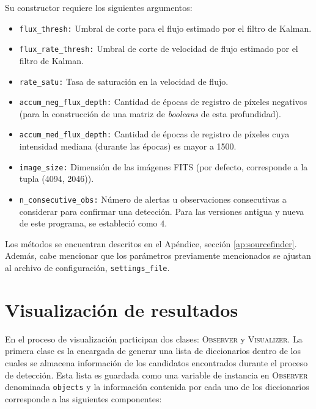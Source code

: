 Su constructor requiere los siguientes argumentos:
\begin{itemize}
\item \texttt{flux\_thresh:} Umbral de corte para el flujo estimado por el filtro de Kalman.
\item \texttt{flux\_rate\_thresh:} Umbral de corte de velocidad de flujo estimado por el filtro de Kalman.
\item \texttt{rate\_satu:} Tasa de saturaci\'on en la velocidad de flujo.
\item \texttt{accum\_neg\_flux\_depth:} Cantidad de \'epocas de registro de p\'ixeles negativos (para la construcci\'on de una matriz de \textit{booleans} de esta profundidad).
\item \texttt{accum\_med\_flux\_depth:} Cantidad de \'epocas de registro de p\'ixeles cuya intensidad mediana (durante las \'epocas) es mayor a 1500.
\item \texttt{image\_size:} Dimensi\'on de las im\'agenes FITS (por defecto, corresponde a la tupla (4094, 2046)).
\item \texttt{n\_consecutive\_obs:} N\'umero de alertas u observaciones consecutivas a considerar para confirmar una detecci\'on. Para las versiones antigua y nueva de este programa, se estableci\'o como $4$.

\end{itemize}

Los m\'etodos se encuentran descritos en el Ap\'endice, secci\'on \ref{ap:sourcefinder}. Adem\'as, cabe mencionar que los par\'ametros previamente mencionados se ajustan al archivo de configuraci\'on, \texttt{settings\_file}.


\section{Visualizaci\'on de resultados}
En el proceso de visualizaci\'on participan dos clases: \textsc{Observer} y \textsc{Visualizer}. La primera clase es la encargada de generar una lista de diccionarios dentro de los cuales se almacena informaci\'on de los candidatos encontrados durante el proceso de detecci\'on. Esta lista es guardada como una variable de instancia en \textsc{Observer} denominada \texttt{objects} y la informaci\'on contenida por cada uno de los diccionarios corresponde a las siguientes componentes:

